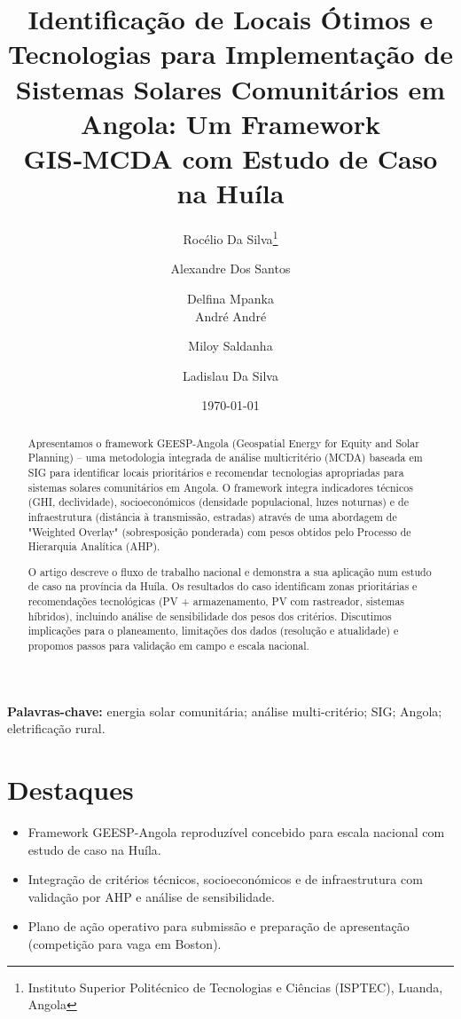 \documentclass[12pt, a4paper]{article}
\begin{document}
\title{Identificação de Locais Ótimos e Tecnologias para Implementação de Sistemas Solares Comunitários em Angola: Um Framework GIS‑MCDA com Estudo de Caso na Huíla}
\author{Rocélio Da Silva\thanks{Instituto Superior Politécnico de Tecnologias e Ciências (ISPTEC), Luanda, Angola} \and Alexandre Dos Santos\footnotemark[1] \and Delfina Mpanka\footnotemark[1] \\
André André\footnotemark[1] \and Miloy Saldanha\footnotemark[1] \and Ladislau Da Silva\footnotemark[1]}
\date{\today}
\maketitle

\begin{abstract}
Apresentamos o framework GEESP-Angola (Geospatial Energy for Equity and Solar Planning) – uma metodologia integrada de análise multicritério (MCDA) baseada em SIG para identificar locais prioritários e recomendar tecnologias apropriadas para sistemas solares comunitários em Angola. O framework integra indicadores técnicos (GHI, declividade), socioeconómicos (densidade populacional, luzes noturnas) e de infraestrutura (distância à transmissão, estradas) através de uma abordagem de "Weighted Overlay" (sobresposição ponderada) com pesos obtidos pelo Processo de Hierarquia Analítica (AHP).

O artigo descreve o fluxo de trabalho nacional e demonstra a sua aplicação num estudo de caso na província da Huíla. Os resultados do caso identificam zonas prioritárias e recomendações tecnológicas (PV + armazenamento, PV com rastreador, sistemas híbridos), incluindo análise de sensibilidade dos pesos dos critérios. Discutimos implicações para o planeamento, limitações dos dados (resolução e atualidade) e propomos passos para validação em campo e escala nacional.
\end{abstract}
\vspace{6pt}
\noindent\textbf{Palavras-chave:} energia solar comunitária; análise multi-critério; SIG; Angola; eletrificação rural.

\section*{Destaques}
\begin{itemize}
    \item Framework GEESP-Angola reproduzível concebido para escala nacional com estudo de caso na Huíla.
    \item Integração de critérios técnicos, socioeconómicos e de infraestrutura com validação por AHP e análise de sensibilidade.
    \item Plano de ação operativo para submissão e preparação de apresentação (competição para vaga em Boston).
\end{itemize}
\end{document}

